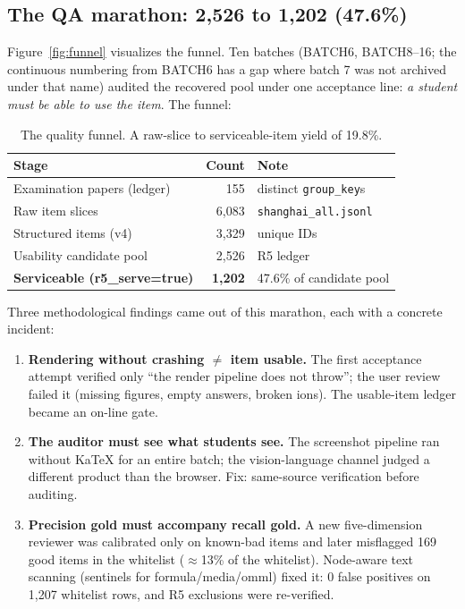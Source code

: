 \subsection{The QA marathon: 2,526 to 1,202 (47.6\%)}
Figure~\ref{fig:funnel} visualizes the funnel. Ten batches (BATCH6, BATCH8--16; the continuous numbering from BATCH6 has a gap where batch 7 was not archived under that name) audited the recovered pool under one acceptance line: \emph{a student must be able to use the item}. The funnel:

\begin{table}[h]
\centering
\small
\begin{tabular}{lrl}
\toprule
\textbf{Stage} & \textbf{Count} & \textbf{Note} \\
\midrule
Examination papers (ledger) & 155 & distinct \texttt{group\_key}s \\
Raw item slices & 6,083 & \texttt{shanghai\_all.jsonl} \\
Structured items (v4) & 3,329 & unique IDs \\
Usability candidate pool & 2,526 & R5 ledger \\
\textbf{Serviceable (r5\_serve=true)} & \textbf{1,202} & 47.6\% of candidate pool \\
\bottomrule
\end{tabular}
\caption{The quality funnel. A raw-slice to serviceable-item yield of 19.8\%.}
\label{tab:funnel}
\end{table}

Three methodological findings came out of this marathon, each with a concrete incident:

\begin{enumerate}\setlength{\itemsep}{0pt}\setlength{\parskip}{0pt}\setlength{\parsep}{0pt}
\item \textbf{Rendering without crashing $\neq$ item usable.} The first acceptance attempt verified only ``the render pipeline does not throw''; the user review failed it (missing figures, empty answers, broken ions). The usable-item ledger became an on-line gate.
\item \textbf{The auditor must see what students see.}\label{it:auditor-sameness} The screenshot pipeline ran without KaTeX for an entire batch; the vision-language channel judged a different product than the browser. Fix: same-source verification before auditing.
\item \textbf{Precision gold must accompany recall gold.} A new five-dimension reviewer was calibrated only on known-bad items and later misflagged 169 good items in the whitelist ($\approx$13\% of the whitelist). Node-aware text scanning (sentinels for formula/media/omml) fixed it: 0 false positives on 1,207 whitelist rows, and R5 exclusions were re-verified.
\end{enumerate}

